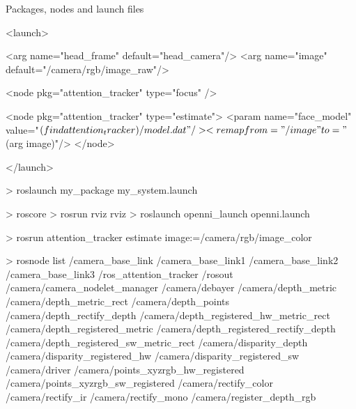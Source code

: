 \documentclass[compress]{beamer}
\begin{document}
\begin{frame}[containsverbatim]{Packages, nodes and launch files}
\begin{xmlcode}
<launch>

  <arg name="head_frame" default="head_camera"/>
  <arg name="image" default="/camera/rgb/image_raw"/>

  <node pkg="attention_tracker" type="focus" />

  <node pkg="attention_tracker" type="estimate">
    <param name="face_model" 
        value="$(find attention_tracker)/model.dat" />
    <remap from="/image" to="$(arg image)"/>
  </node>

</launch>
\end{xmlcode}
\begin{shcode}
> roslaunch my_package my_system.launch
\end{shcode}
\end{frame}


\begin{frame}[containsverbatim]{}

\begin{shcode}
> roscore
> rosrun rviz rviz
> roslaunch openni_launch openni.launch
\end{shcode}

\end{frame}



\begin{frame}[containsverbatim]{}

\begin{shcode}
> rosrun attention_tracker estimate 
                         image:=/camera/rgb/image_color
\end{shcode}

\end{frame}


\begin{frame}[containsverbatim]{}
\begin{shcode}
> rosnode list 
/camera_base_link
/camera_base_link1
/camera_base_link2
/camera_base_link3
/ros_attention_tracker
/rosout
/camera/camera_nodelet_manager
/camera/debayer
/camera/depth_metric
/camera/depth_metric_rect
/camera/depth_points
/camera/depth_rectify_depth
/camera/depth_registered_hw_metric_rect
/camera/depth_registered_metric
/camera/depth_registered_rectify_depth
/camera/depth_registered_sw_metric_rect
/camera/disparity_depth
/camera/disparity_registered_hw
/camera/disparity_registered_sw
/camera/driver
/camera/points_xyzrgb_hw_registered
/camera/points_xyzrgb_sw_registered
/camera/rectify_color
/camera/rectify_ir
/camera/rectify_mono
/camera/register_depth_rgb
\end{shcode}

\end{frame}
\end{document}
